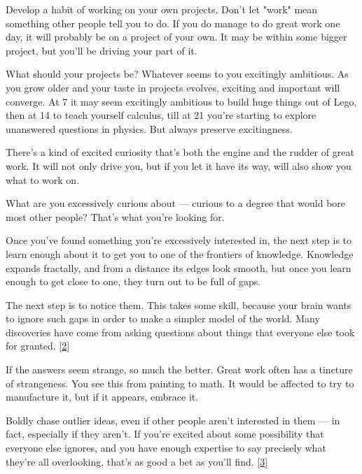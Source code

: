 Develop a
                  habit of working on your own projects. Don't let "work" mean
                  something other people tell you to do. If you do manage to do
                  great work one day, it will probably be on a project of your
                  own. It may be within some bigger project, but you'll be
                  driving your part of it.

What should your projects
                  be? Whatever seems to you excitingly ambitious. As you grow
                  older and your taste in projects evolves, exciting and
                  important will converge. At 7 it may seem excitingly ambitious
                  to build huge things out of Lego, then at 14 to teach yourself
                  calculus, till at 21 you're starting to explore unanswered
                  questions in physics. But always preserve excitingness.

There's
                  a kind of excited curiosity that's both the engine and the
                  rudder of great work. It will not only drive you, but if you
                  let it have its way, will also show you what to work on.

What
                  are you excessively curious about --- curious to a degree
                  that would bore most other people? That's what you're looking
                  for.

Once you've found something you're excessively
                  interested in, the next step is to learn enough about it to
                  get you to one of the frontiers of knowledge. Knowledge
                  expands fractally, and from a distance its edges look smooth,
                  but once you learn enough to get close to one, they turn out
                  to be full of gaps.

The next step is to notice
                  them. This takes some skill, because your brain wants to
                  ignore such gaps in order to make a simpler model of the
                  world. Many discoveries have come from asking questions about
                  things that everyone else took for granted.
                  [\href{\#f2n}{2}]

If the answers seem strange, so much the better.
                  Great work often has a tincture of strangeness. You see this
                  from painting to math. It would be affected to try to
                  manufacture it, but if it appears, embrace it.

Boldly
                  chase outlier ideas, even if other people aren't interested in
                  them --- in fact, especially if they aren't. If you're
                  excited about some possibility that everyone else ignores, and
                  you have enough expertise to say precisely what they're all
                  overlooking, that's as good a bet as you'll find.
                  [\href{\#f3n}{3}]

